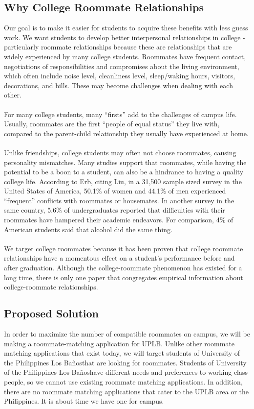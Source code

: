 \documentclass[journal]{./IEEE/IEEEtran}
\newcommand{\UPLB}{University of the Philippines Los Ba\~{n}os}
\begin{document}
    \subsection{Why College Roommate Relationships}
    Our goal is to make it easier for students to acquire these benefits with less guess work. We want students to develop better interpersonal relationships in college - particularly roommate relationships because these are relationships that are widely experienced by many college students\cite{erb}. Roommates have frequent contact, negotiations of responsibilities and compromises about the living environment, which often include noise level, cleanliness level, sleep/waking hours, visitors, decorations, and bills\cite{erb}. These may become challenges when dealing with each other.
    \\
    \\
    \indent For many college students, many ``firsts'' add to the challenges of campus life. Usually, roommates are the first ``people of equal status'' they live with, compared to the parent-child relationship they usually have experienced at home\cite{erb}.
    \\
    \\
    \indent Unlike friendships, college students may often not choose roommates, causing personality mismatches. Many studies support that roommates, while having the potential to be a boon to a student, can also be a hindrance to having a quality college life. According to Erb\cite{erb}, citing Liu\cite{liu}, in a 31,500 sample sized survey in the United States of America, 50.1\% of women and 44.1\% of men experienced “frequent” conflicts with roommates or housemates. In another survey in the same country, 5.6\% of undergraduates reported that difficulties with their roommates have hampered their academic endeavors\cite{erb}. For comparison, 4\% of American students said that alcohol did the same thing\cite{erb}.
    \\
    \\
    \indent We target college roommates because it has been proven that college roommate relationships have a momentous effect on a student's performance before and after graduation. Although the college-roommate phenomenon has existed for a long time, there is only one paper that congregates empirical information about college-roommate relationships\cite{erb}.

    \subsection{Proposed Solution}
    In order to maximize the number of compatible roommates on campus, we will be making a roommate-matching application for UPLB. Unlike other roommate matching applications that exist today, we will target students of \UPLB that are looking for roommates. Students of \UPLB have different needs and preferences to working class people, so we cannot use existing roommate matching applications. In addition, there are no roommate matching applications that cater to the UPLB area or the Philippines. It is about time we have one for campus.
\end{document}
